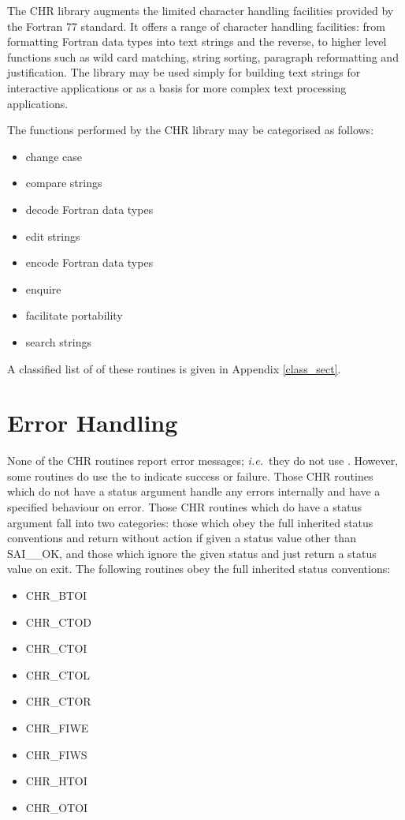 The CHR library augments the limited character handling facilities
provided by the Fortran 77 standard.
It offers a range of character handling facilities: from formatting
Fortran data types into text strings and the reverse, to higher level
functions such as wild card matching, string sorting, paragraph
reformatting and justification. 
The library may be used simply for building text strings for interactive
applications or as a basis for more complex text processing applications.

The functions performed by the CHR library may be categorised as follows:

\begin{itemize}
\item change case
\item compare strings
\item decode Fortran data types 
\item edit strings
\item encode Fortran data types 
\item enquire
\item facilitate portability
\item search strings
\end{itemize}

A classified list of of these routines is given in Appendix \ref{class_sect}.


\section {Error Handling \label{err_sect} }

None of the CHR routines report error messages; {\em i.e.}\ they do not use 
.
However, some routines do use the 
to indicate success or failure.
Those CHR routines which do not have a status argument handle any errors
internally and have a specified behaviour on error.
Those CHR routines which do have a status argument fall into two categories:
those which obey the full inherited status conventions and return without 
action if given a status value other than SAI\_\_OK, and those which ignore 
the given status and just return a status value on exit.
The following routines obey the full inherited status conventions:

\begin {itemize}
\item CHR\_BTOI
\item CHR\_CTOD
\item CHR\_CTOI
\item CHR\_CTOL
\item CHR\_CTOR
\item CHR\_FIWE
\item CHR\_FIWS
\item CHR\_HTOI
\item CHR\_OTOI
\end {itemize}

